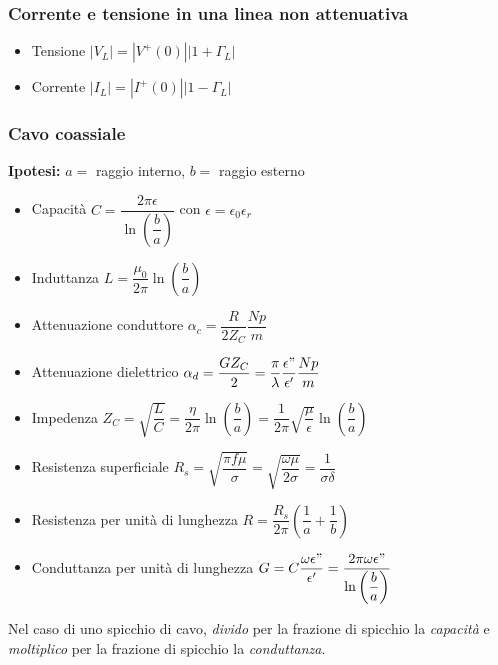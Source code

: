 \documentclass{article}
\begin{document}
\subsubsection{Corrente e tensione in una linea non attenuativa}
\begin{itemize}
	\item Tensione \(|V_L| = \left| V^+(0) \right| \left|1 + \Gamma_L \right|\)
	\item Corrente \(|I_L| = \left| I^+(0) \right| \left|1 - \Gamma_L \right|\)
\end{itemize}

\newpage

\subsubsection{Cavo coassiale}
\textbf{Ipotesi:} \(a = \) raggio interno, \(b = \) raggio esterno 
\begin{itemize}
	\item Capacità \( C = \dfrac{2 \pi \epsilon}{\ln\left(\dfrac{b}{a}\right)} \) con \( \epsilon = \epsilon_0 \epsilon_r \)
	\item Induttanza \( L = \dfrac{\mu_0}{2 \pi} \ln\left(\dfrac{b}{a}\right) \)
	\item Attenuazione conduttore \( \alpha_c = \dfrac{R}{2 Z_C} \dfrac{Np}{m}\)
	\item Attenuazione dielettrico \( \alpha_d = \dfrac{G Z_C}{2} = \dfrac{\pi}{\lambda}\dfrac{\epsilon"}{\epsilon'} \dfrac{Np}{m}\)
	\item Impedenza \( Z_C = \sqrt{\dfrac{L}{C}} = \dfrac{\eta}{2 \pi} \ln\left(\dfrac{b}{a} \right) =  \dfrac{1}{2 \pi} \sqrt{\dfrac{\mu}{\epsilon}} \ln\left(\dfrac{b}{a}\right)\)
	\item Resistenza superficiale \( R_s = \sqrt{\dfrac{\pi f \mu}{\sigma}} = \sqrt{\dfrac{\omega \mu}{2 \sigma}} = \dfrac{1}{\sigma \delta} \)
	\item Resistenza per unità di lunghezza \( R = \dfrac{R_s}{2 \pi} \left( \dfrac{1}{a} + \dfrac{1}{b} \right) \)
	\item Conduttanza per unità di lunghezza \( G = C \dfrac{\omega\epsilon"}{\epsilon'} = \dfrac{2 \pi \omega \epsilon"}{\ln\left(\dfrac{b}{a} \right)} \)
\end{itemize}
Nel caso di uno spicchio di cavo, \textit{divido} per la frazione di spicchio la \textit{capacità} e \textit{moltiplico} per la frazione di spicchio la \textit{conduttanza}.
\end{document}
